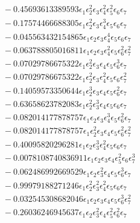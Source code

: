\documentclass[10pt]{article}
\begin{document}
\begin{align*}
&{}  - 0.45693613389593 \epsilon_{1} \epsilon_{2}^{2} \epsilon_{3} \epsilon_{4}^{2} \epsilon_{5}^{2} \epsilon_{6} \epsilon_{7} \\
&{}  - 0.17574466688305 \epsilon_{1} \epsilon_{2}^{2} \epsilon_{3} \epsilon_{4}^{3} \epsilon_{5} \epsilon_{6} \epsilon_{7} \\
&{}  - 0.045563432154865 \epsilon_{1} \epsilon_{2} \epsilon_{3} \epsilon_{4}^{4} \epsilon_{5} \epsilon_{6} \epsilon_{7} \\
&{}  - 0.063788805016811 \epsilon_{1} \epsilon_{2} \epsilon_{3} \epsilon_{4}^{2} \epsilon_{5} \epsilon_{6}^{2} \epsilon_{7}^{2} \\
&{}  - 0.07029786675322 \epsilon_{1} \epsilon_{2}^{2} \epsilon_{3} \epsilon_{4} \epsilon_{5} \epsilon_{6}^{3} \epsilon_{7} \\
&{}  - 0.07029786675322 \epsilon_{1} \epsilon_{2}^{2} \epsilon_{3} \epsilon_{4}^{2} \epsilon_{5} \epsilon_{6} \epsilon_{7}^{2} \\
&{}  - 0.14059573350644 \epsilon_{1} \epsilon_{2}^{3} \epsilon_{3} \epsilon_{4} \epsilon_{5} \epsilon_{6}^{2} \epsilon_{7} \\
&{}  - 0.63658623782083 \epsilon_{1} \epsilon_{2}^{2} \epsilon_{3}^{3} \epsilon_{4} \epsilon_{5} \epsilon_{6} \epsilon_{7} \\
&{}  - 0.082014177878757 \epsilon_{1} \epsilon_{2} \epsilon_{3} \epsilon_{4}^{3} \epsilon_{5} \epsilon_{6}^{2} \epsilon_{7} \\
&{}  - 0.082014177878757 \epsilon_{1} \epsilon_{2}^{2} \epsilon_{3} \epsilon_{4} \epsilon_{5} \epsilon_{6}^{2} \epsilon_{7}^{2} \\
&{}  - 0.40095820296281 \epsilon_{1} \epsilon_{2} \epsilon_{3}^{3} \epsilon_{4}^{2} \epsilon_{5} \epsilon_{6} \epsilon_{7} \\
&{}  - 0.0078108740836911 \epsilon_{1} \epsilon_{2} \epsilon_{3} \epsilon_{4} \epsilon_{5}^{2} \epsilon_{6} \epsilon_{7}^{3} \\
&{}  - 0.062486992669529 \epsilon_{1} \epsilon_{2} \epsilon_{3}^{2} \epsilon_{4} \epsilon_{5} \epsilon_{6}^{3} \epsilon_{7} \\
&{}  - 0.99979188271246 \epsilon_{1} \epsilon_{2}^{2} \epsilon_{3}^{2} \epsilon_{4}^{2} \epsilon_{5} \epsilon_{6} \epsilon_{7} \\
&{}  - 0.032545308682046 \epsilon_{1} \epsilon_{2} \epsilon_{3} \epsilon_{4} \epsilon_{5} \epsilon_{6}^{3} \epsilon_{7}^{2} \\
&{}  - 0.26036246945637 \epsilon_{1} \epsilon_{2} \epsilon_{3}^{2} \epsilon_{4} \epsilon_{5}^{2} \epsilon_{6}^{2} \epsilon_{7} \\

\end{align*}
\end{document}
